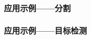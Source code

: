 \documentclass{beamer}
\begin{document}
{{\begin{frame}
  \qquad{}
\end{frame}}{\begin{frame}
  \frametitle{应用示例------分割}
  
  {\hspace{3em}}
\end{frame}}{\begin{frame}
  \frametitle{应用示例------目标检测}
  

\end{frame}}}
\end{document}
